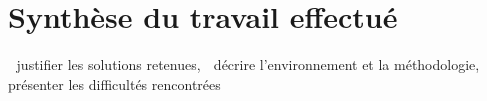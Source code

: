 \section{Synthèse du travail effectué}

 justifier les solutions retenues,
 décrire l'environnement et la méthodologie,
 présenter les difficultés rencontrées